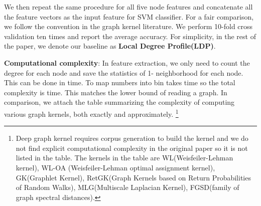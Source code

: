 \documentclass[11pt,onecolumn]{article}
\begin{document}
We then repeat the same procedure for all five node features and concatenate all the feature vectors as the input feature for SVM classifier. For a fair comparison, we follow the convention in the graph kernel literature. We perform 10-fold cross validation ten times and report the average accuracy. For simplicity, in the rest of the paper, we denote our baseline as \textbf{ Local Degree Profile(LDP)}.

\textbf{Computational complexity}:
In feature extraction, we only need to count the degree for each node and save the statistics of 1- neighborhood for each node. This can be done in  time. To map  numbers into  bin takes  time so the total complexity is  time. This matches the lower bound of reading a graph. In comparison, we attach the table summarizing the complexity of computing various graph kernels, both exactly and approximately.
\footnote{Deep graph kernel requires corpus generation to build the kernel and we do not find explicit computational complexity in the original paper so it is not listed in the table. The kernels in the table are WL(Weisfeiler-Lehman kernel)\cite{shervashidze2011weisfeiler}, WL-OA (Weisfeiler-Lehman optimal assignment kernel)\cite{kriege2016valid}, GK(Graphlet Kernel)\cite{shervashidze2009efficient}, RetGK(Graph Kernels based on Return Probabilities
of Random Walks)\cite{zhang2018retgk}, MLG(Multiscale Laplacian Kernel)\cite{kondor2016multiscale}, FGSD(family of graph spectral distances)\cite{verma2017hunt}.} 
\end{document}
